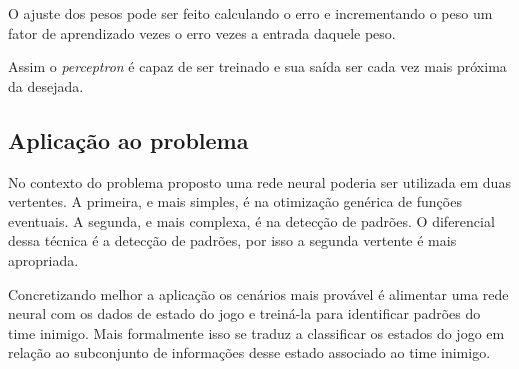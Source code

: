 O ajuste dos pesos pode ser feito calculando o erro e incrementando o peso um fator de
aprendizado vezes o erro vezes a entrada daquele peso.

Assim o \textit{perceptron} é capaz de ser treinado e sua saída ser cada vez mais próxima da desejada.




\subsection{Aplicação ao problema}

No contexto do problema proposto uma rede neural poderia ser utilizada em duas vertentes.
A primeira, e mais simples, é na otimização genérica de funções eventuais.
A segunda, e mais complexa, é na detecção de padrões.
O diferencial dessa técnica é a detecção de padrões, por isso a segunda vertente é mais apropriada.

Concretizando melhor a aplicação os cenários mais provável é alimentar uma rede neural
com os dados de estado do jogo e treiná-la para identificar padrões do time inimigo.
Mais formalmente isso se traduz a classificar os estados do jogo em relação ao subconjunto de
informações desse estado associado ao time inimigo.

